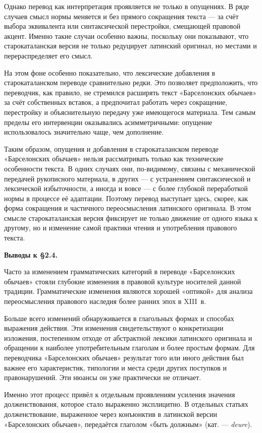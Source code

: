 Однако перевод как интерпретация проявляется не только в опущениях. В ряде случаев смысл нормы меняется и без прямого сокращения текста --- за счёт выбора эквивалента или синтаксической перестройки, смещающей правовой акцент. Именно такие случаи особенно важны, поскольку они показывают, что старокаталанская версия не только редуцирует латинский оригинал, но местами и перераспределяет его смысл.

На этом фоне особенно показательно, что лексические добавления в старокаталанском переводе сравнительно редки. Это позволяет предположить, что переводчик, как правило, не стремился расширять текст «Барселонских обычаев» за счёт собственных вставок, а предпочитал работать через сокращение, перестройку и объяснительную передачу уже имеющегося материала. Тем самым пределы его интервенции оказывались асимметричными: опущение использовалось значительно чаще, чем дополнение.

Таким образом, опущения и добавления в старокаталанском переводе «Барселонских обычаев» нельзя рассматривать только как технические особенности текста. В одних случаях они, по-видимому, связаны с механической передачей рукописного материала, в других --- с устранением синтаксической и лексической избыточности, а иногда и вовсе --- с более глубокой переработкой нормы в процессе её адаптации. Поэтому перевод выступает здесь, скорее, как форма сокращения и частичного переосмысления латинского оригинала. В этом смысле старокаталанская версия фиксирует не только движение от одного языка к другому, но и изменение самой практики чтения и употребления правового текста.

\textbf{Выводы к §2.4}\textbf{.}

Часто за изменением грамматических категорий в переводе «Барселонских обычаев» стояли глубокие изменения в правовой культуре носителей данной традиции. Грамматические изменения являются хорошей «оптикой» для анализа переосмысления правового наследия более ранних эпох в XIII~в.

Больше всего изменений обнаруживается в глагольных формах и способах выражения действия. Эти изменения свидетельствуют о конкретизации изложения, постепенном отходе от абстрактной лексики латинского оригинала и обращении к наиболее употребительным глаголам и более простым формам. Для переводчика «Барселонских обычаев» результат того или иного действия был важнее его характеристик, типологии и места среди других поступков и правонарушений. Эти нюансы он уже практически не отличает.

Именно этот процесс привёл к отдельным проявлениям усиления значения долженствования, которое стало выраженно эксплицитно. В отдельных статьях долженствование, выраженное через конъюнктив в латинской версии «Барселонских обычаев», передаётся глаголом «быть должным» (кат. --- \emph{deure}).

